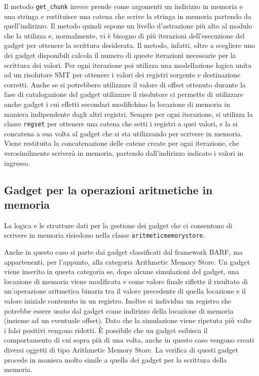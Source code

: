 Il metodo \lstinline{get_chunk} invece prende come argomenti un
indirizzo in memoria e una stringa e restituisce una catena che scrive
la stringa in memoria partendo da quell'indirizzo. Il metodo quindi
espone un livello d'astrazione più alto al modulo che la utilizza e,
normalmente, vi è bisogno di più iterazioni dell'esecuzione del gadget
per ottenere la scrittura desiderata. Il metodo, infatti, oltre a
scegliere uno dei gadget disponibili calcola il numero di queste
iterazioni necessarie per la scrittura dei valori. Per ogni iterazione
poi utilizza una modellazione logica unita ad un risolutore SMT per
ottenere i valori dei registri sorgente e destinazione corretti. Anche
se si potrebbero utilizzare il valore di offset ottenuto durante la
fase di catalogazione del gadget utilizzare il risolutore ci permette
di utilizzare anche gadget i cui effetti secondari modifichino la
locazione di memoria in maniera indipendente dagli altri
registri. Sempre per ogni iterazione, si utilizza la classe
\lstinline{regset} per ottenere una catena che setti i registri a quei
valori, e la si concatena a sua volta al gadget che si sta utilizzando
per scrivere in memoria. Viene restituita la concatenazione delle
catene create per ogni iterazione, che verosimilmente scriverà in
memoria, partendo dall'indirizzo indicato i valori in ingresso.

\subsection{Gadget per la operazioni aritmetiche in
  memoria}
\label{sec:arithmeticstore}

La logica e le strutture dati per la gestione dei gadget che ci
consentono di scrivere in memoria risiedono nella classe
\lstinline{aritmeticmemorystore}.

Anche in questo caso si parte dai gadget classificati dal framework
BARF, ma appartenenti, per l'appunto, alla categoria Arithmetic Memory
Store. Un gadget viene inserito in questa categoria se, dopo alcune
simulazioni del gadget, una locazione di memoria viene modificata e
come valore finale riflette il risultato di un'operazione aritmetica
binaria tra il valore precedente di quella locazione e il valore
iniziale contenuto in un registro. Inoltre si individua un registro
che potrebbe essere usato dal gadget come indirizzo della locazione di
memoria (insieme ad un eventuale offset). Dato che la simulazione
viene ripetuta più volte i falsi positivi vengono ridotti. È possibile
che un gadget esibisca il comportamento di cui sopra più di una volta,
anche in questo caso vengono creati diversi oggetti di tipo Arithmetic
Memory Store. La verifica di questi gadget procede in maniera molto
simile a quella dei gadget per la scrittura della memoria.



